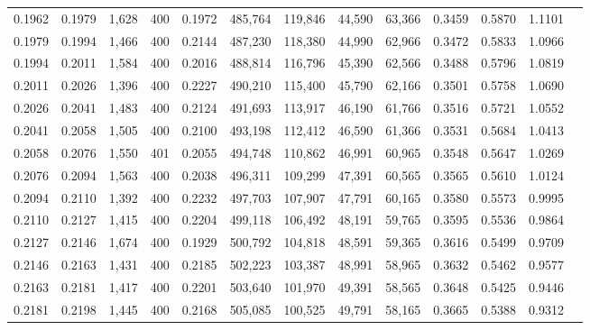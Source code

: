 \begin{tabular}{rrrrrrrrrrrrr}
0.1962 & 0.1979 &  1,628 &   400 &                                     0.1972 & 485,764 & 119,846 &  44,590 &  63,366 & 0.3459 & 0.5870 & 1.1101 \\
0.1979 & 0.1994 &  1,466 &   400 &                                     0.2144 & 487,230 & 118,380 &  44,990 &  62,966 & 0.3472 & 0.5833 & 1.0966 \\
0.1994 & 0.2011 &  1,584 &   400 &                                     0.2016 & 488,814 & 116,796 &  45,390 &  62,566 & 0.3488 & 0.5796 & 1.0819 \\
0.2011 & 0.2026 &  1,396 &   400 &                                     0.2227 & 490,210 & 115,400 &  45,790 &  62,166 & 0.3501 & 0.5758 & 1.0690 \\
0.2026 & 0.2041 &  1,483 &   400 &                                     0.2124 & 491,693 & 113,917 &  46,190 &  61,766 & 0.3516 & 0.5721 & 1.0552 \\
0.2041 & 0.2058 &  1,505 &   400 &                                     0.2100 & 493,198 & 112,412 &  46,590 &  61,366 & 0.3531 & 0.5684 & 1.0413 \\
0.2058 & 0.2076 &  1,550 &   401 &                                     0.2055 & 494,748 & 110,862 &  46,991 &  60,965 & 0.3548 & 0.5647 & 1.0269 \\
0.2076 & 0.2094 &  1,563 &   400 &                                     0.2038 & 496,311 & 109,299 &  47,391 &  60,565 & 0.3565 & 0.5610 & 1.0124 \\
0.2094 & 0.2110 &  1,392 &   400 &                                     0.2232 & 497,703 & 107,907 &  47,791 &  60,165 & 0.3580 & 0.5573 & 0.9995 \\
0.2110 & 0.2127 &  1,415 &   400 &                                     0.2204 & 499,118 & 106,492 &  48,191 &  59,765 & 0.3595 & 0.5536 & 0.9864 \\
0.2127 & 0.2146 &  1,674 &   400 &                                     0.1929 & 500,792 & 104,818 &  48,591 &  59,365 & 0.3616 & 0.5499 & 0.9709 \\
0.2146 & 0.2163 &  1,431 &   400 &                                     0.2185 & 502,223 & 103,387 &  48,991 &  58,965 & 0.3632 & 0.5462 & 0.9577 \\
0.2163 & 0.2181 &  1,417 &   400 &                                     0.2201 & 503,640 & 101,970 &  49,391 &  58,565 & 0.3648 & 0.5425 & 0.9446 \\
0.2181 & 0.2198 &  1,445 &   400 &                                     0.2168 & 505,085 & 100,525 &  49,791 &  58,165 & 0.3665 & 0.5388 & 0.9312 \\

\end{tabular}
